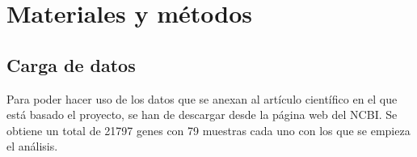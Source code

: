 \section{Materiales y métodos}
\subsection{Carga de datos}
Para poder hacer uso de los datos que se anexan al artículo científico en el que está basado el proyecto, se han de descargar desde la página web del NCBI. Se obtiene un total de 21797 genes con 79 muestras cada uno con los que se empieza el análisis.

